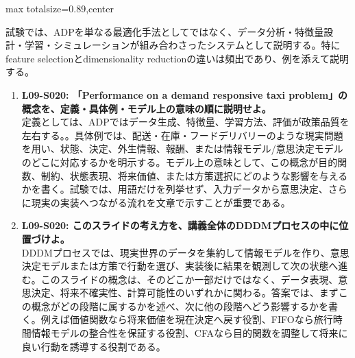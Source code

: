 \begin{minipage}[t]{0.58\textwidth}
\begin{adjustbox}{max totalsize={\textwidth}{0.89\textheight},center}
\begin{minipage}{\textwidth}
試験では、ADPを単なる最適化手法としてではなく、データ分析・特徴量設計・学習・シミュレーションが組み合わさったシステムとして説明する。特にfeature selectionとdimensionality reductionの違いは頻出であり、例を添えて説明する。\par{}\begin{enumerate}\item \textbf{L09-S020: 「Performance on a demand responsive taxi problem」の概念を、定義・具体例・モデル上の意味の順に説明せよ。}\\定義としては、ADPではデータ生成、特徴量、学習方法、評価が政策品質を左右する。。具体例では、配送・在庫・フードデリバリーのような現実問題を用い、状態、決定、外生情報、報酬、または情報モデル/意思決定モデルのどこに対応するかを明示する。モデル上の意味として、この概念が目的関数、制約、状態表現、将来価値、または方策選択にどのような影響を与えるかを書く。試験では、用語だけを列挙せず、入力データから意思決定、さらに現実の実装へつながる流れを文章で示すことが重要である。\item \textbf{L09-S020: このスライドの考え方を、講義全体のDDDMプロセスの中に位置づけよ。}\\DDDMプロセスでは、現実世界のデータを集約して情報モデルを作り、意思決定モデルまたは方策で行動を選び、実装後に結果を観測して次の状態へ進む。このスライドの概念は、そのどこか一部だけではなく、データ表現、意思決定、将来不確実性、計算可能性のいずれかに関わる。答案では、まずこの概念がどの段階に属するかを述べ、次に他の段階へどう影響するかを書く。例えば価値関数なら将来価値を現在決定へ戻す役割、FIFOなら旅行時間情報モデルの整合性を保証する役割、CFAなら目的関数を調整して将来に良い行動を誘導する役割である。\end{enumerate}
\end{minipage}
\end{adjustbox}
\end{minipage}


